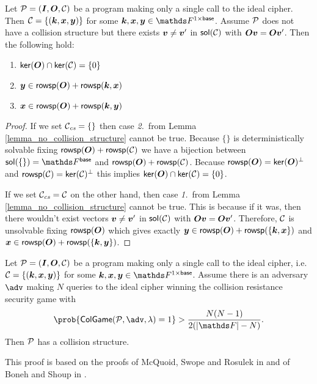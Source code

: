 \begin{corollary}
\label{single_query_properties}
    Let $\P = (\I, \O, \C)$ be a program making only a single call to the ideal cipher.
    Then $\C = \{ (\vk, \vx, \vy)\}$ for some $\vk, \vx, \vy \in \Frowsp$.
    Assume $\P$ does not have a collision structure but there exists $\vv \neq \vv'$ in $\sol(\C)$ with $\O\vv = \O\vv'$.
    Then the following hold:
    \begin{enumerate}
    \item $\ker(\O) \cap \ker(\C) = \{0\}$
    \item $\vy \in \rowsp(\O) + \rowsp(\vk, \vx)$
    \item $\vx \in \rowsp(\O) + \rowsp(\vk, \vy)$
    \end{enumerate}
\end{corollary}
\begin{proof}
    If we set $\Ccs = \{\}$ then case \textit{2.}~from Lemma \ref{lemma_no_collision_structure} cannot be true.
    Because $\{\}$ is deterministically solvable fixing $\rowsp(\O) + \rowsp(\C)$ we have a bijection between
    $\sol(\{\}) = \Fsp$ and $\rowsp(\O) + \rowsp(\C)$.
    Because $\rowsp(\O) = \ker(\O)^\perp$ and $\rowsp(\C) = \ker(\C)^\perp$
    this implies $\ker(\O) \cap \ker(\C) = \{0\}$.
    
    If we set $\Ccs = \C$ on the other hand,
    then case \textit{1.}~from Lemma \ref{lemma_no_collision_structure} cannot be true.
    This is because if it was, then there wouldn't exist vectors $\vv \neq \vv'$ in $\sol(\C)$ with $\O\vv = \O\vv'$.
    Therefore, $\C$ is unsolvable fixing $\rowsp(\O)$ which gives exactly 
    $\vy \in \rowsp(\O) + \rowsp(\{\vk, \vx\})$ and
    $\vx \in \rowsp(\O) + \rowsp(\{\vk, \vy\})$.
\end{proof}

\begin{prop}
\label{prop_single_query_cr_resistance}
    Let $\P = (\I, \O, \C)$ be a program making only a single call to the ideal cipher,
    i.e. $\C = \{ (\vk, \vx, \vy)\}$ for some $\vk, \vx, \vy \in \Frowsp$.
    Assume there is an adversary $\adv$ making $N$ queries to the ideal cipher winning the collision resistance security game with
    \[
        \prob{\mathsf{ColGame}(\P, \adv, \lambda) = 1 } > \frac{N(N-1)}{2(|\F| - N)}.
    \]
    Then $\P$ has a collision structure.
\end{prop}

This proof is based on the proofs of McQuoid, Swope and Rosulek in \cite[Lemma 10]{TCC:McQSwoRos19} and of Boneh and Shoup in \cite[Theorem 8.4 (Davies-Meyer)]{Boneh2015CourseIA}.

